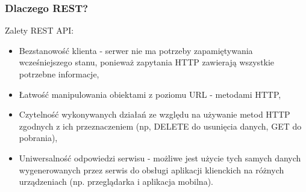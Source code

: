 \subsubsection{Dlaczego REST?}
Zalety REST API:
\begin{itemize}
    \item Bezstanowość klienta - serwer nie ma potrzeby zapamiętywania wcześniejszego stanu, ponieważ zapytania HTTP zawierają wszystkie potrzebne informacje,
    \item Łatwość manipulowania obiektami z poziomu URL - metodami HTTP,
    \item Czytelność wykonywanych działań ze względu na używanie metod HTTP zgodnych z ich przeznaczeniem (np, DELETE do usunięcia danych, GET do pobrania),
    \item Uniwersalność odpowiedzi serwisu - możliwe jest użycie tych samych danych wygenerowanych przez serwis do obsługi aplikacji klienckich na różnych urządzeniach (np. przeglądarka i aplikacja mobilna).
\end{itemize}
